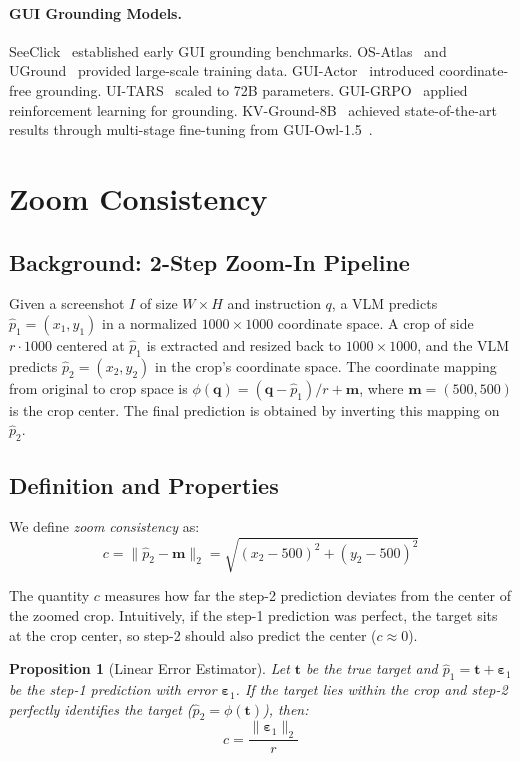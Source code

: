 \documentclass{article}
\newtheorem{proposition}{Proposition}
\begin{document}
\paragraph{GUI Grounding Models.}
SeeClick~\cite{seeclick} established early GUI grounding benchmarks. OS-Atlas~\cite{osatlas} and UGround~\cite{uground} provided large-scale training data. GUI-Actor~\cite{guiactor} introduced coordinate-free grounding. UI-TARS~\cite{uitars} scaled to 72B parameters. GUI-GRPO~\cite{guigrpo} applied reinforcement learning for grounding. KV-Ground-8B~\cite{kvground} achieved state-of-the-art results through multi-stage fine-tuning from GUI-Owl-1.5~\cite{guiowl}.

\section{Zoom Consistency}

\subsection{Background: 2-Step Zoom-In Pipeline}

Given a screenshot $I$ of size $W \times H$ and instruction $q$, a VLM predicts $\hat{p}_1 = (x_1, y_1)$ in a normalized $1000\times1000$ coordinate space. A crop of side $r \cdot 1000$ centered at $\hat{p}_1$ is extracted and resized back to $1000\times1000$, and the VLM predicts $\hat{p}_2 = (x_2, y_2)$ in the crop's coordinate space. The coordinate mapping from original to crop space is $\phi(\mathbf{q}) = (\mathbf{q} - \hat{p}_1)/r + \mathbf{m}$, where $\mathbf{m} = (500, 500)$ is the crop center. The final prediction is obtained by inverting this mapping on $\hat{p}_2$.

\subsection{Definition and Properties}

We define \emph{zoom consistency} as:
\begin{equation}
    c = \|\hat{p}_2 - \mathbf{m}\|_2 = \sqrt{(x_2 - 500)^2 + (y_2 - 500)^2}
\end{equation}

The quantity $c$ measures how far the step-2 prediction deviates from the center of the zoomed crop. Intuitively, if the step-1 prediction was perfect, the target sits at the crop center, so step-2 should also predict the center ($c \approx 0$).

\begin{proposition}[Linear Error Estimator]\label{prop:linear}
Let $\mathbf{t}$ be the true target and $\hat{p}_1 = \mathbf{t} + \boldsymbol{\varepsilon}_1$ be the step-1 prediction with error $\boldsymbol{\varepsilon}_1$. If the target lies within the crop and step-2 perfectly identifies the target ($\hat{p}_2 = \phi(\mathbf{t})$), then:
\begin{equation}
    c = \frac{\|\boldsymbol{\varepsilon}_1\|_2}{r}
\end{equation}
\end{proposition}
\end{document}
